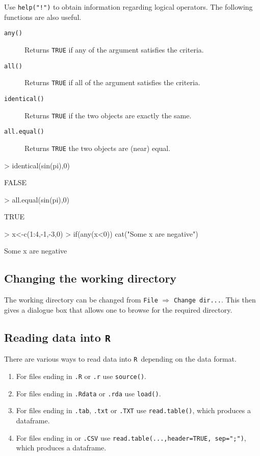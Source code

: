 \documentclass[12pt,A4,makeidx]{article}
\newcommand{\tR}{\texttt{R}}
\begin{document}
Use \texttt{help("!")} to obtain information regarding logical operators. The following functions are also useful.
\begin{description}
\item[\texttt{any()}] Returns \texttt{TRUE} if any of the argument satisfies the criteria.
\item[\texttt{all()}] Returns \texttt{TRUE} if all of the argument satisfies the criteria.
\item[\texttt{identical()}] Returns \texttt{TRUE} if the two objects are exactly the same.
\item[\texttt{all.equal()}] Returns \texttt{TRUE} the two objects are (near) equal.
\end{description}

\begin{Schunk}
\begin{Sinput}
> identical(sin(pi),0)
\end{Sinput}
\begin{Soutput}
[1] FALSE
\end{Soutput}
\begin{Sinput}
> all.equal(sin(pi),0)
\end{Sinput}
\begin{Soutput}
[1] TRUE
\end{Soutput}
\begin{Sinput}
> x<-c(1:4,-1,-3,0)
> if(any(x<0)) cat("Some x are negative")
\end{Sinput}
\begin{Soutput}
Some x are negative
\end{Soutput}
\end{Schunk}

\subsection{Changing the working directory}
The working directory can be changed from \texttt{File} $\Rightarrow$ \texttt{Change dir...}. This then gives a dialogue box that allows one to browse
for the required directory.

\subsection{Reading data into \texttt{R}}
There are various ways to read data into \tR\ depending on the data format.
\begin{enumerate}
\item For files ending in \texttt{.R} or \texttt{.r} use \texttt{source()}.
\item For files ending in \texttt{.Rdata} or \texttt{.rda} use \texttt{load()}.
\item For files ending in \texttt{.tab}, \texttt{.txt} or \texttt{.TXT} use \texttt{read.table()}, which produces a dataframe.
\item For files ending in  or \texttt{.CSV} use \texttt{read.table(...,header=TRUE, sep=";")}, which produces a dataframe.
\end{enumerate}
\end{document}
